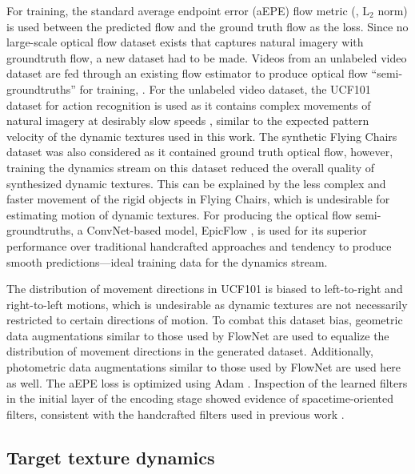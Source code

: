 For training, the standard average
endpoint error (aEPE) flow metric (\ie, $\text{L}_2$
norm) is used between the predicted flow and the ground truth
flow as the loss.
Since no large-scale optical flow dataset exists that captures
natural imagery with groundtruth flow, a new dataset had to be made. Videos
from an unlabeled video dataset are fed through an existing flow
estimator to produce optical
flow ``semi-groundtruths'' for training,
\cf \cite{tran2016}.
For the unlabeled video dataset, the UCF101
dataset for action recognition \cite{soomro2012ucf101} is used as it contains complex movements of natural imagery at desirably slow speeds , similar to the expected pattern velocity of the dynamic textures used in this work. The synthetic Flying Chairs dataset \cite{dosovitskiy2015} was also considered as it contained ground truth optical flow, however, training the dynamics stream on this dataset reduced the overall quality of synthesized dynamic textures. This can be explained by the less complex and faster movement of the rigid objects in Flying Chairs, which is undesirable for estimating motion of dynamic textures.
For producing the optical flow semi-groundtruths, a ConvNet-based model, EpicFlow \cite{revaud2015epicflow}, is used for 
its superior performance over traditional handcrafted approaches and tendency
to produce smooth predictions---ideal training data for the dynamics stream. 

The distribution of movement directions  in UCF101 is biased to left-to-right and right-to-left motions, which is undesirable as dynamic textures are not necessarily restricted to certain directions of motion. To combat this dataset bias, geometric data augmentations similar to those used by FlowNet \cite{dosovitskiy2015} are used to equalize the distribution of movement directions in the generated dataset. Additionally, photometric data augmentations similar to those used by FlowNet \cite{dosovitskiy2015} are used here as well. The aEPE loss is optimized using Adam \cite{kingma2017}.
Inspection of the learned filters in the initial layer of the encoding stage
showed evidence of spacetime-oriented filters, consistent with
the handcrafted filters used in previous work \cite{derpanis2012spacetime}. 

\subsection{Target texture dynamics}

